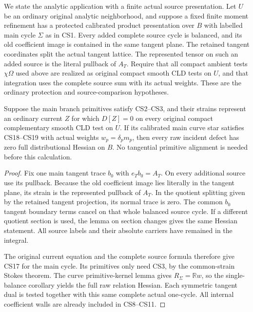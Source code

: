 We state the analytic application with a finite actual source
presentation.  Let $U$ be an ordinary original analytic
neighborhood, and suppose a fixed finite moment refinement has
a protected calibrated product presentation over $B$ with
labelled main cycle $\Sigma$ as in CS1.  Every added complete
source cycle is balanced, and its old coefficient image is
contained in the same tangent plane.  The retained tangent
coordinates split the actual tangent lattice.  The represented
tensor on such an added source is the literal pullback of
$A_T$.  Require that all compact ambient tests
$\chi\Omega$ used above are realized as original compact
smooth CLD tests on $U$, and that integration uses the complete
source sum with its actual weights.  These are the ordinary
protection and source-comparison hypotheses.

\begin{theorem}
\label{thm:r13-actual-completed-curve-detector}
Suppose the main branch primitives satisfy CS2--CS3, and their
strains represent an ordinary current $Z$ for which
$D[Z]=0$ on every original compact complementary smooth CLD
test on $U$.  If its calibrated main curve star satisfies
CS18--CS19 with actual weights $w_p=\delta_pm_p$, then every
raw incident defect has zero full distributional Hessian on
$B$.  No tangential primitive alignment is needed before this
calculation.
\end{theorem}

\begin{proof}
Fix one main tangent trace $b_0$ with $e_Tb_0=A_T$.  On every
additional source use its pullback.  Because the old coefficient
image lies literally in the tangent plane, its strain is the
represented pullback of $A_T$.  In the quotient splitting given
by the retained tangent projection, its normal trace is zero.
The common $b_0$ tangent boundary terms cancel on that whole
balanced source cycle.  If a different quotient section is
used, the lemma on section changes gives the same Hessian
statement.  All source labels and their absolute carriers have
remained in the integral.

The original current equation and the complete source formula
therefore give CS17 for the main cycle.  Its primitives only
need CS3, by the common-strain Stokes theorem.  The curve
primitive-kernel lemma gives $R_\Sigma=\mathbb Rw$, so the
single-balance corollary yields the full raw relation Hessian.
Each symmetric tangent dual is tested together with this same
complete actual one-cycle.  All internal coefficient walls are
already included in CS8--CS11.
\end{proof}

